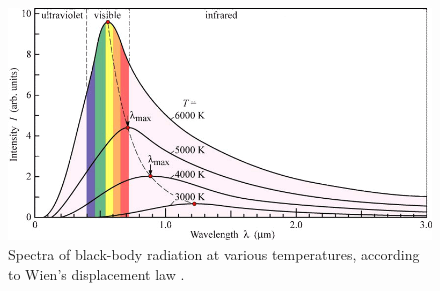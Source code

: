 \begin{rotatepage}
\begin{figure}
    \centering
    \includegraphics[width=\textwidth]{figures/sampleFig2.png}
    \caption[Black-body radiation]{Spectra of black-body radiation at various temperatures, according to Wien's displacement law \cite{wannier1987statistical}.}
    \label{fig:secondFig}
\end{figure}
\end{rotatepage}
